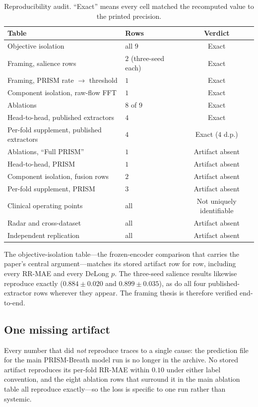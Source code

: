 \begin{table}[!t]
\caption{Reproducibility audit. ``Exact'' means every cell matched the recomputed value to the printed
precision.}
\label{tab:audit}\centering\small
\setlength{\tabcolsep}{3.5pt}
\begin{tabular}{@{}llc@{}}\toprule
Table & Rows & Verdict\\\midrule
Objective isolation & all $9$ & Exact\\
Framing, salience rows & $2$ (three-seed each) & Exact\\
Framing, PRISM rate $\to$ threshold & $1$ & Exact\\
Component isolation, raw-flow FFT & $1$ & Exact\\
Ablations & $8$ of $9$ & Exact\\
Head-to-head, published extractors & $4$ & Exact\\
Per-fold supplement, published extractors & $4$ & Exact ($4$ d.p.)\\\midrule
Ablations, ``Full PRISM'' & $1$ & Artifact absent\\
Head-to-head, PRISM & $1$ & Artifact absent\\
Component isolation, fusion rows & $2$ & Artifact absent\\
Per-fold supplement, PRISM & $3$ & Artifact absent\\
Clinical operating points & all & Not uniquely identifiable\\
Radar and cross-dataset & all & Artifact absent\\
Independent replication & all & Artifact absent\\\bottomrule
\end{tabular}
\end{table}

The objective-isolation table---the frozen-encoder comparison that carries the paper's central
argument---matches its stored artifact row for row, including every RR-MAE and every DeLong $p$. The
three-seed salience results likewise reproduce exactly ($0.884{\pm}0.020$ and $0.899{\pm}0.035$), as do
all four published-extractor rows wherever they appear. The framing thesis is therefore verified
end-to-end.

\subsection{One missing artifact}
Every number that did \emph{not} reproduce traces to a single cause: the prediction file for the main
PRISM-Breath model run is no longer in the archive. No stored artifact reproduces its per-fold RR-MAE
within $0.10$ under either label convention, and the eight ablation rows that surround it in the main
ablation table all reproduce exactly---so the loss is specific to one run rather than systemic.

